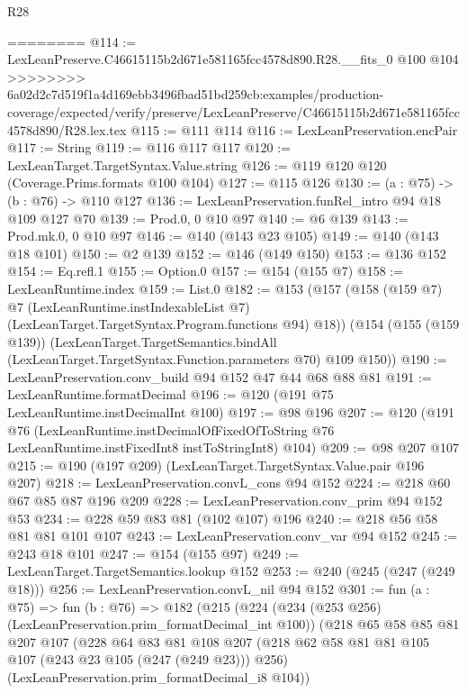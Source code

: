 \begin{lexlean}{R28}
\begin{coremodule}
{{{{{========
@114 := LexLeanPreserve.C46615115b2d671e581165fcc4578d890.R28.__fits_0 @100 @104
>>>>>>>> 6a02d2c7d519f1a4d169ebb3496fbad51bd259cb:examples/production-coverage/expected/verify/preserve/LexLeanPreserve/C46615115b2d671e581165fcc4578d890/R28.lex.tex
@115 := @111 @114
@116 := LexLeanPreservation.encPair
@117 := String
@119 := @116 @117 @117
@120 := LexLeanTarget.TargetSyntax.Value.string
@126 := @119 @120 @120 (Coverage.Prims.formats @100 @104)
@127 := @115 @126
@130 := (a : @75) -> (b : @76) -> @110 @127
@136 := LexLeanPreservation.funRel_intro @94 @18 @109 @127 @70
@139 := Prod.{0, 0} @10 @97
@140 := @6 @139
@143 := Prod.mk.{0, 0} @10 @97
@146 := @140 (@143 @23 @105)
@149 := @140 (@143 @18 @101)
@150 := @2 @139
@152 := @146 (@149 @150)
@153 := @136 @152
@154 := Eq.refl.{1}
@155 := Option.{0}
@157 := @154 (@155 @7)
@158 := LexLeanRuntime.index
@159 := List.{0}
@182 := @153
    (@157
      (@158
        (@159 @7)
        @7
        (LexLeanRuntime.instIndexableList @7)
        (LexLeanTarget.TargetSyntax.Program.functions @94)
        @18))
    (@154
      (@155 (@159 @139))
      (LexLeanTarget.TargetSemantics.bindAll
        (LexLeanTarget.TargetSyntax.Function.parameters @70)
        @109
        @150))
@190 := LexLeanPreservation.conv_build @94 @152 @47 @44 @68 @88 @81
@191 := LexLeanRuntime.formatDecimal
@196 := @120 (@191 @75 LexLeanRuntime.instDecimalInt @100)
@197 := @98 @196
@207 := @120
    (@191
      @76
      (LexLeanRuntime.instDecimalOfFixedOfToString
        @76
        LexLeanRuntime.instFixedInt8
        instToStringInt8)
      @104)
@209 := @98 @207 @107
@215 := @190 (@197 @209) (LexLeanTarget.TargetSyntax.Value.pair @196 @207)
@218 := LexLeanPreservation.convL_cons @94 @152
@224 := @218 @60 @67 @85 @87 @196 @209
@228 := LexLeanPreservation.conv_prim @94 @152 @53
@234 := @228 @59 @83 @81 (@102 @107) @196
@240 := @218 @56 @58 @81 @81 @101 @107
@243 := LexLeanPreservation.conv_var @94 @152
@245 := @243 @18 @101
@247 := @154 (@155 @97)
@249 := LexLeanTarget.TargetSemantics.lookup @152
@253 := @240 (@245 (@247 (@249 @18)))
@256 := LexLeanPreservation.convL_nil @94 @152
@301 := fun (a : @75) =>
  fun (b : @76) =>
  @182
    (@215
      (@224
        (@234 (@253 @256) (LexLeanPreservation.prim_formatDecimal_int @100))
        (@218
          @65
          @58
          @85
          @81
          @207
          @107
          (@228
            @64
            @83
            @81
            @108
            @207
            (@218 @62 @58 @81 @81 @105 @107 (@243 @23 @105 (@247 (@249 @23))) @256)
            (LexLeanPreservation.prim_formatDecimal_i8 @104))
}}}}}
\end{coremodule}
\end{lexlean}
